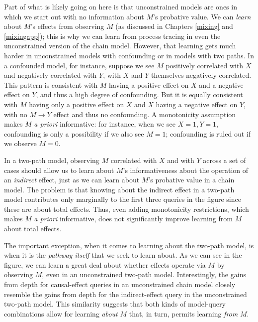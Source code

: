 \documentclass[
  12pt,
]{book}
\begin{document}
Part of what is likely going on here is that unconstrained models are ones in which we start out with no information about \(M\)'s probative value. We can \emph{learn} about \(M\)'s effects from observing \(M\) (as discussed in Chapters \ref{mixing} and \ref{mixingapp}); this is why we can learn from process tracing in even the unconstrained version of the chain model. However, that learning gets much harder in unconstrained models with confounding or in models with two paths. In a confounded model, for instance, suppose we see \(M\) positively correlated with \(X\) and negatively correlated with \(Y\), with \(X\) and \(Y\) themselves negatively correlated. This pattern is consistent with \(M\) having a positive effect on \(X\) and a negative effect on \(Y\), and thus a high degree of confounding. But it is equally consistent with \(M\) having only a positive effect on \(X\) and \(X\) having a negative effect on \(Y\), with no \(M \rightarrow Y\) effect and thus no confounding. A monotonicity assumption makes \(M\) \emph{a priori} informative: for instance, when we see \(X=1, Y=1\), confounding is only a possibility if we also see \(M=1\); confounding is ruled out if we observe \(M=0\).

In a two-path model, observing \(M\) correlated with \(X\) and with \(Y\) across a set of cases should allow us to learn about \(M\)'s informativeness about the operation of an \emph{indirect} effect, just as we can learn about \(M\)'s probative value in a chain model. The problem is that knowing about the indirect effect in a two-path model contributes only marginally to the first three queries in the figure since these are about total effects. Thus, even adding monotonicity restrictions, which makes \(M\) \emph{a priori} informative, does not significantly improve learning from \(M\) about total effects.

The important exception, when it comes to learning about the two-path model, is when it is the \emph{pathway itself} that we seek to learn about. As we can see in the figure, we can learn a great deal about whether effects operate via \(M\) by observing \(M\), even in an unconstrained two-path model. Interestingly, the gains from depth for causal-effect queries in an unconstrained chain model closely resemble the gains from depth for the indirect-effect query in the unconstrained two-path model. This similarity suggests that both kinds of model-query combinations allow for learning \emph{about} \(M\) that, in turn, permits learning \emph{from} \(M\).
\end{document}
